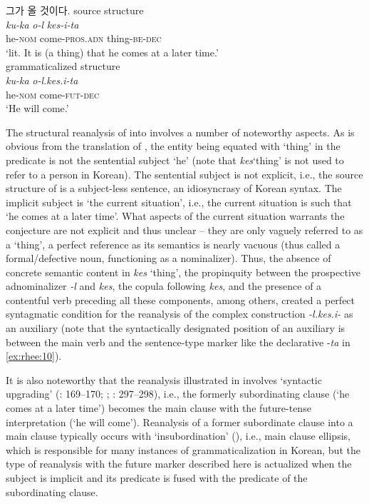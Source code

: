 \documentclass[output=paper,colorlinks,citecolor=brown]{langscibook}
\begin{document}
\ea \textkorean{그가 올 것이다}. \label{ex:rhee:10}
    \ea source structure\\ \label{ex:rhee:10a}
    \gll \textit{ku-ka} \textit{o-l} \textit{kes-i-ta}\\
         he-\textsc{nom} come-\textsc{pros.adn} thing-\textsc{be-dec}\\
    \glt ‘lit. It is (a thing) that he comes at a later time.’\\

    \ex grammaticalized structure\\ \label{ex:rhee:10b}
    \gll \textit{ku-ka} \textit{o-l.kes.i-ta}\\
         he-\textsc{nom} come-\textsc{fut-dec}\\
    \glt ‘He will come.’\\
    \z
\z

The structural reanalysis of  into  involves a number of noteworthy aspects. As is obvious from the translation of , the entity being equated with ‘thing’ in the predicate is not the sentential subject ‘he’ (note that \textit{kes}‘thing’ is not used to refer to a person in Korean). The sentential subject is not explicit, i.e., the source structure of  is a subject-less sentence, an idiosyncrasy of Korean syntax. The implicit subject is ‘the current situation’, i.e., the current situation is such that ‘he comes at a later time’. What aspects of the current situation warrants the conjecture are not explicit and thus unclear – they are only vaguely referred to as a ‘thing’, a perfect reference as its semantics is nearly vacuous (thus called a formal/defective noun, functioning as a nominalizer). Thus, the absence of concrete semantic content in \textit{kes} ‘thing’, the propinquity between the prospective adnominalizer \textit{-l} and \textit{kes}, the copula following \textit{kes}, and the presence of a contentful verb preceding all these components, among others, created a perfect syntagmatic condition for the reanalysis of the complex construction \textit{-l.kes.i-} as an auxiliary (note that the syntactically designated position of an auxiliary is between the main verb and the sentence-type marker like the declarative -\textit{ta} in \ref{ex:rhee:10}). 

It is also noteworthy that the reanalysis illustrated in  involves ‘syntactic upgrading’ (\cite{Heine1991}: 169--170; \cite{Ramm2008}; \cite{Rhee2012a}: 297--298), i.e., the formerly subordinating clause (‘he comes at a later time’) becomes the main clause with the future-tense interpretation (‘he will come’). Reanalysis of a former subordinate clause into a main clause typically occurs with ‘insubordination’ (\cite{Evans2007}), i.e., main clause ellipsis, which is responsible for many instances of grammaticalization in Korean, but the type of reanalysis with the future marker described here is actualized when the subject is implicit and its predicate is fused with the predicate of the subordinating clause. 
\end{document}

